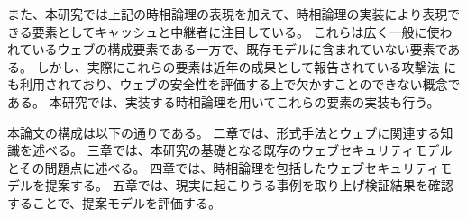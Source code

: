 \documentclass[12pt,a4paper]{jbook}
\begin{document}
また、本研究では上記の時相論理の表現を加えて、時相論理の実装により表現できる要素としてキャッシュと中継者に注目している。
これらは広く一般に使われているウェブの構成要素である一方で、既存モデルに含まれていない要素である。
しかし、実際にこれらの要素は近年の成果として報告されている攻撃法
\textcolor{red}{
\cite{bcpattack}
}
にも利用されており、ウェブの安全性を評価する上で欠かすことのできない概念である。
本研究では、実装する時相論理を用いてこれらの要素の実装も行う。

本論文の構成は以下の通りである。
二章では、形式手法とウェブに関連する知識を述べる。
三章では、本研究の基礎となる既存のウェブセキュリティモデルとその問題点に述べる。
四章では、時相論理を包括したウェブセキュリティモデルを提案する。
五章では、現実に起こりうる事例を取り上げ検証結果を確認することで、提案モデルを評価する。
\end{document}
